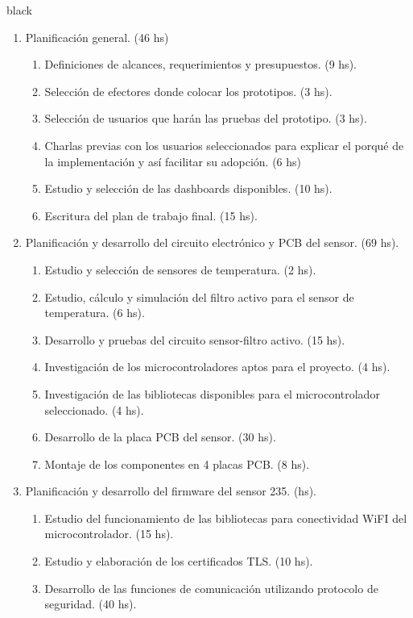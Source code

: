 \documentclass[11pt]{charter}
\begin{document}
\begin{consigna}{black}
\begin{enumerate}
\item Planificación general. (46 hs)
	\begin{enumerate}
	\item Definiciones de alcances, requerimientos y presupuestos. (9 hs).
	\item Selección de efectores donde colocar los prototipos. (3 hs).
	\item Selección de usuarios que harán las pruebas del prototipo. (3 hs).
	\item Charlas previas con los usuarios seleccionados para explicar el porqué de la implementación y así facilitar su adopción. (6 hs)
	\item Estudio y selección de las dashboards disponibles. (10 hs).
	\item Escritura del plan de trabajo final. (15 hs).
	\end{enumerate}
\item Planificación y desarrollo del circuito electrónico y PCB del sensor. (69 hs).
	\begin{enumerate}
	\item Estudio y selección de sensores de temperatura. (2 hs).
	\item Estudio, cálculo y simulación del filtro activo para el sensor de temperatura. (6 hs).
	\item Desarrollo y pruebas del circuito sensor-filtro activo. (15 hs).
    \item Investigación de los microcontroladores aptos para el proyecto. (4 hs).	
	\item Investigación de las bibliotecas disponibles para el microcontrolador seleccionado. (4 hs).
	\item Desarrollo de la placa PCB del sensor. (30 hs).
	\item Montaje de los componentes en 4 placas PCB. (8 hs).
	\end{enumerate}
\item Planificación y desarrollo del firmware del sensor 235.  (hs).
	\begin{enumerate}
	\item Estudio del funcionamiento de las bibliotecas para conectividad WiFI del microcontrolador. (15 hs).
	\item Estudio y elaboración de los certificados TLS.  (10 hs).
	\item Desarrollo de las funciones de comunicación utilizando protocolo de seguridad. (40 hs).

\end{enumerate}
\end{enumerate}
\end{consigna}
\end{document}
